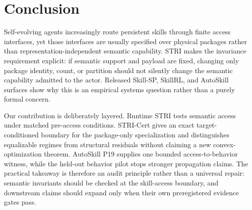 \section{Conclusion}
\label{sec:conclusion}
Self-evolving agents increasingly route persistent skills through finite access interfaces, yet those interfaces are usually specified over physical packages rather than representation-independent semantic capability. STRI makes the invariance requirement explicit: if semantic support and payload are fixed, changing only package identity, count, or partition should not silently change the semantic capability admitted to the actor. Released Skill-SP, SkillRL, and AutoSkill surfaces show why this is an empirical systems question rather than a purely formal concern.

Our contribution is deliberately layered. Runtime STRI tests semantic access under matched pre-access conditions. STRI-Cert gives an exact target-conditioned boundary for the package-only specialization and distinguishes equalizable regimes from structural residuals without claiming a new convex-optimization theorem. AutoSkill P19 supplies one bounded access-to-behavior witness, while the held-out behavior pilot stops stronger propagation claims. The practical takeaway is therefore an audit principle rather than a universal repair: semantic invariants should be checked at the skill-access boundary, and downstream claims should expand only when their own preregistered evidence gates pass.

